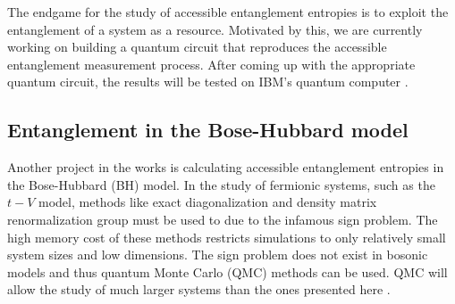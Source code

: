 	The endgame for the study of accessible entanglement entropies is to exploit the entanglement of a system as a resource. Motivated by this, we are currently working on building a quantum circuit that reproduces the accessible entanglement measurement process. After coming up with the appropriate quantum circuit, the results will be tested on IBM's quantum computer \cite{IBM:QM}.
%
	
	\subsection{Entanglement in the Bose-Hubbard model}
	
	Another project in the works is calculating accessible entanglement entropies in the Bose-Hubbard (BH) model. In the study of fermionic systems, such as the $t-V$ model, methods like exact diagonalization and density matrix renormalization group must be used to due to the infamous sign problem. The high memory cost of these methods restricts simulations to only relatively small system sizes and low dimensions. The sign problem does not exist in bosonic models and thus quantum Monte Carlo (QMC) methods can be used. QMC will allow the study of much larger systems than the ones presented here \cite{Hastings:2010dc, Herdman:2016ep}.